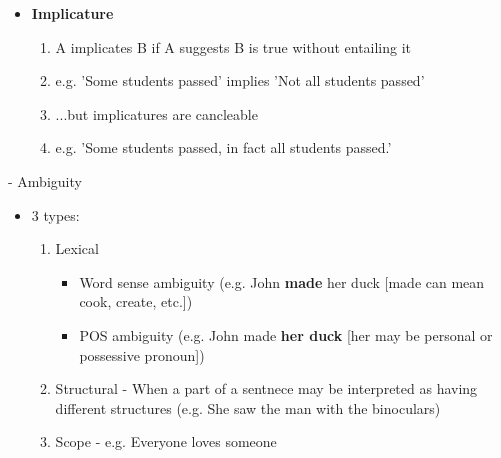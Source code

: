 \documentclass[11pt]{article}
\newenvironment{itemise}{
\begin{itemize}
  \setlength{\itemsep}{1pt}
  \setlength{\parskip}{0pt}
  \setlength{\parsep}{0pt}
}{\end{itemize}}
\begin{document}
\begin{itemise}
\begin{itemise}
\begin{itemise}
\begin{itemise}
\begin{enumerate}
	  \begin{enumerate}
	   \item Lexical triggers: (regret, realize, know, stop, start, blame, fault)
	   \item Cleft constructions: (It was John that ate the sandwhich -> Someone ate the sandwhich)
	  \end{enumerate}
	 \item Words can have presuppositions (A sleeps -> A is capble of sleeping [c.f. green ideas sleep furiously])
	\end{enumerate}
       \item {\bf Implicature}
	\begin{enumerate}
	 \item A implicates B if A suggests B is true without entailing it
	 \item e.g. 'Some students passed' implies 'Not all students passed'
         \item ...but implicatures are cancleable
	 \item e.g. 'Some students passed, in fact all students passed.'
	\end{enumerate}
      \end{itemise}
    \end{itemise}
  \end{itemise}
\end{itemise}
- Ambiguity
\begin{itemise}
 \item 3 types:
  \begin{enumerate}
   \item Lexical
    \begin{itemise}
     \item Word sense ambiguity (e.g. John {\bf made} her duck [made can mean cook, create, etc.])
     \item POS ambiguity (e.g. John made {\bf her duck} [her may be personal or possessive pronoun])
    \end{itemise}
   \item Structural - When a part of a sentnece may be interpreted as having different structures (e.g. She saw the man with the binoculars)
   \item Scope - e.g. Everyone loves someone
  \end{enumerate}

\end{itemise}

\end{document}
